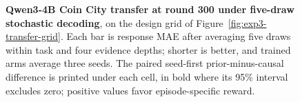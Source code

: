 \begin{figure}[t]
{%
}
\caption{\textbf{Qwen3-4B Coin City transfer at round 300 under five-draw
stochastic decoding}, on the design grid of
Figure~\ref{fig:exp3-transfer-grid}. Each bar is response MAE after averaging
five draws within task and four evidence depths; shorter is better, and trained
arms average three seeds. The paired seed-first prior-minus-causal difference is
printed under each cell, in bold where its 95\% interval excludes zero; positive
values favor episode-specific reward.}
\label{fig:exp3-transfer-results}
\end{figure}
